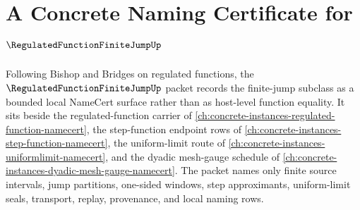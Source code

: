 \chapter{A Concrete Naming Certificate for $\RegulatedFunctionFiniteJumpUp$}
\label{ch:concrete-instances-regulated-function-finite-jump-namecert}

Following Bishop and Bridges on regulated functions, the $\RegulatedFunctionFiniteJumpUp$ packet records the finite-jump subclass as a bounded local NameCert surface rather than as host-level function equality. It sits beside the regulated-function carrier of \autoref{ch:concrete-instances-regulated-function-namecert}, the step-function endpoint rows of \autoref{ch:concrete-instances-step-function-namecert}, the uniform-limit route of \autoref{ch:concrete-instances-uniformlimit-namecert}, and the dyadic mesh-gauge schedule of \autoref{ch:concrete-instances-dyadic-mesh-gauge-namecert}. The packet names only finite source intervals, jump partitions, one-sided windows, step approximants, uniform-limit seals, transport, replay, provenance, and local naming rows.

